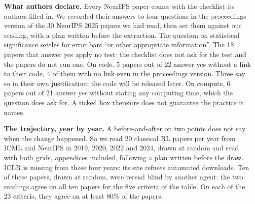 \documentclass[11pt,a4paper]{article}
\begin{document}
\textbf{What authors declare.} Every NeurIPS paper comes with the
checklist its authors filled in. We recorded their answers to four
questions in the proceedings version of the 30 NeurIPS 2025 papers we
had read, then set them against our reading, with a plan written before
the extraction. The question on statistical significance settles for
error bars ``or other appropriate information''. The 18 papers that
answer yes apply no test: the checklist does not ask for the test and
the papers do not run one. On code, 5 papers out of 22 answer yes
without a link to their code, 4 of them with no link even in the
proceedings version. Three say so in their own justification: the code
will be released later. On compute, 6 papers out of 21 answer yes
without stating any computing time, which the question does ask for. A
ticked box therefore does not guarantee the practice it names.

\textbf{The trajectory, year by year.} A before-and-after on two points
does not say when the change happened. So we read 20 classical RL papers
per year from ICML and NeurIPS in 2019, 2020, 2022 and 2024, drawn at
random and read with both grids, appendices included, following a plan
written before the draw. ICLR is missing from these four years: its site
refuses automated downloads. Ten of these papers, drawn at random, were
reread blind by another agent: the two readings agree on all ten papers
for the five criteria of the table. On each of the 23 criteria, they
agree on at least 80\% of the papers.
\end{document}
